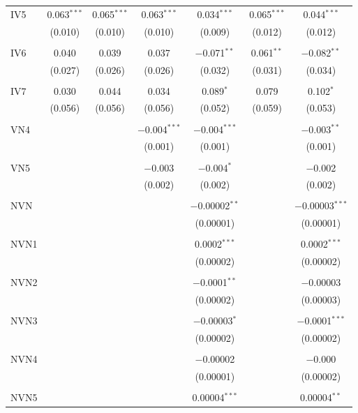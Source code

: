\begin{table}[!htbp]
\begin{tabular}{@{\extracolsep{5pt}}lcccccc}
 IV5 & 0.063$^{***}$ & 0.065$^{***}$ & 0.063$^{***}$ & 0.034$^{***}$ & 0.065$^{***}$ & 0.044$^{***}$ \\ 
  & (0.010) & (0.010) & (0.010) & (0.009) & (0.012) & (0.012) \\ 
  & & & & & & \\ 
 IV6 & 0.040 & 0.039 & 0.037 & $-$0.071$^{**}$ & 0.061$^{**}$ & $-$0.082$^{**}$ \\ 
  & (0.027) & (0.026) & (0.026) & (0.032) & (0.031) & (0.034) \\ 
  & & & & & & \\ 
 IV7 & 0.030 & 0.044 & 0.034 & 0.089$^{*}$ & 0.079 & 0.102$^{*}$ \\ 
  & (0.056) & (0.056) & (0.056) & (0.052) & (0.059) & (0.053) \\ 
  & & & & & & \\ 
 VN4 &  &  & $-$0.004$^{***}$ & $-$0.004$^{***}$ &  & $-$0.003$^{**}$ \\ 
  &  &  & (0.001) & (0.001) &  & (0.001) \\ 
  & & & & & & \\ 
 VN5 &  &  & $-$0.003 & $-$0.004$^{*}$ &  & $-$0.002 \\ 
  &  &  & (0.002) & (0.002) &  & (0.002) \\ 
  & & & & & & \\ 
 NVN &  &  &  & $-$0.00002$^{**}$ &  & $-$0.00003$^{***}$ \\ 
  &  &  &  & (0.00001) &  & (0.00001) \\ 
  & & & & & & \\ 
 NVN1 &  &  &  & 0.0002$^{***}$ &  & 0.0002$^{***}$ \\ 
  &  &  &  & (0.00002) &  & (0.00002) \\ 
  & & & & & & \\ 
 NVN2 &  &  &  & $-$0.0001$^{**}$ &  & $-$0.00003 \\ 
  &  &  &  & (0.00002) &  & (0.00003) \\ 
  & & & & & & \\ 
 NVN3 &  &  &  & $-$0.00003$^{*}$ &  & $-$0.0001$^{***}$ \\ 
  &  &  &  & (0.00002) &  & (0.00002) \\ 
  & & & & & & \\ 
 NVN4 &  &  &  & $-$0.00002 &  & $-$0.000 \\ 
  &  &  &  & (0.00001) &  & (0.00002) \\ 
  & & & & & & \\ 
 NVN5 &  &  &  & 0.00004$^{***}$ &  & 0.00004$^{**}$ \\ 

\end{tabular}
\end{table}
